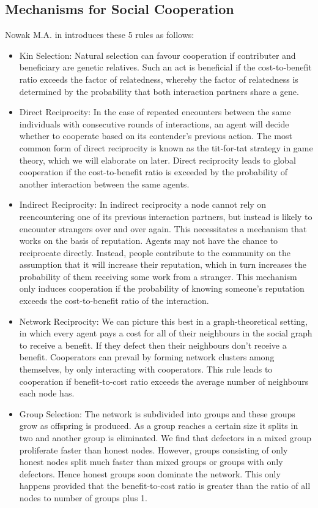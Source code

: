 \documentclass[11pt,a4paper]{article}
\theoremstyle{definition}
\theoremstyle{theorem}
\theoremstyle{proposition}
\theoremstyle{corollary}
\theoremstyle{lemma}
\theoremstyle{example}
\theoremstyle{remark}
\begin{document}
\subsection{Mechanisms for Social Cooperation}
\label{subsec:Mechanisms for Social Cooperation}
Nowak M.A. in \cite{5 Rules for the Evolution of Cooperation} introduces these 5 rules as follows:
\begin{itemize}
\item Kin Selection: Natural selection can favour cooperation if contributer and beneficiary are genetic relatives. Such an act is beneficial if the cost-to-benefit ratio exceeds the factor of relatedness, whereby the factor of relatedness is determined by the probability that both interaction partners share a gene.
\item Direct Reciprocity: In the case of repeated encounters between the same individuals with consecutive rounds of interactions, an agent will decide whether to cooperate based on its contender's previous action. The most common form of direct reciprocity is known as the tit-for-tat strategy in game theory, which we will elaborate on later. Direct reciprocity leads to global cooperation if the cost-to-benefit ratio is exceeded by the probability of another interaction between the same agents.
\item Indirect Reciprocity: In indirect reciprocity a node cannot rely on reencountering one of its previous interaction partners, but instead is likely to encounter strangers over and over again. %
This necessitates a mechanism that works on the basis of reputation. Agents may not have the chance to reciprocate directly. Instead, people contribute to the community on the assumption that it will increase their reputation, which in turn increases the probability of them receiving some work from a stranger. This mechanism only induces cooperation if the probability of knowing someone's reputation exceeds the cost-to-benefit ratio of the interaction.
\item Network Reciprocity: We can picture this best in a graph-theoretical setting, in which every agent pays a cost for all of their neighbours in the social graph to receive a benefit. If they defect then their neighbours don't receive a benefit. Cooperators can prevail by forming network clusters among themselves, by only interacting with cooperators. This rule leads to cooperation if benefit-to-cost ratio exceeds the average number of neighbours each node has. 
\item Group Selection: The network is subdivided into groups and these groups grow as offspring is produced. As a group reaches a certain size  it splits in two and another group is eliminated. We find that defectors in a mixed group proliferate faster than honest nodes. However, groups consisting of only honest nodes split much faster than mixed groups or groups with only defectors. Hence honest groups soon dominate the network. This only happens provided that the benefit-to-cost ratio is greater than the ratio of all nodes to number of groups plus 1. \vspace{1em}\\
\end{itemize}
\end{document}
